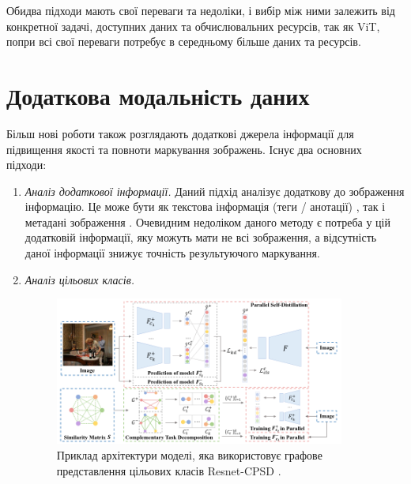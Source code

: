 \documentclass{udstu}
\begin{document}
Обидва підходи мають свої переваги та недоліки, і вибір між ними залежить від конкретної задачі,
доступних даних та обчислювальних ресурсів, так як ViT, попри всі свої переваги потребує в середньому
більше даних та ресурсів.

\section{Додаткова модальність даних}

Більш нові роботи також розглядають додаткові джерела інформації для підвищення якості та повноти
маркування зображень. Існує два основних підходи:

\begin{enumerate}
	\item \textit{Аналіз додаткової інформації.}
	Даний підхід аналізує додаткову до зображення інформацію.
	Це може бути як текстова інформація (теги / анотації) \cite{cnn-sinn,sr-cnn-rnn},
	так і метадані зображення \cite{cnn-neighbors,cnn-location}.
	Очевидним недоліком даного методу є потреба у цій додатковій інформації,
	яку можуть мати не всі зображення, а відсутність даної інформації
	знижує точність результуючого маркування.

	\item \textit{Аналіз цільових класів.}

	\begin{figure}[!ht]
	\centering
	\includegraphics[width=0.9\textwidth]{PNG/resnet-cpsd-arch}
	\caption{
	Приклад архітектури моделі, яка використовує
	графове представлення цільових класів Resnet-CPSD \cite{cpsd}.
	}
	\label{figure:resnet-cpsd}
	\end{figure}


\end{enumerate}
\end{document}
